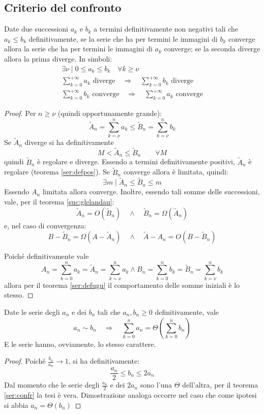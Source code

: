 \subsection{Criterio del confronto}
\begin{teor}
	\label{ser:confr}
	Date due successioni $a_k$ e $b_k$ a termini definitivamente non negativi tali che $a_k\leq b_k$ definitivamente, se la serie che ha per termini le immagini di $b_k$ converge allora la serie che ha per termini le immagini di $a_k$ converge; se la seconda diverge allora la prima diverge. In simboli:
	\begin{gather*}
		\exists\nu\mid 0\leq a_k\leq b_k \quad\forall k\geq\nu\\
		\sum_{k=0}^{+\infty} a_k \text{ diverge}\quad\Rightarrow\quad \sum_{k=0}^{+\infty} b_k \text{ diverge}\\
		\sum_{k=0}^{+\infty} b_k \text{ converge}\quad\Rightarrow\quad \sum_{k=0}^{+\infty} a_k \text{ converge}
	\end{gather*}
\end{teor}
\begin{proof}
	Per $n\geq\nu$ (quindi opportunamente grande):
	\[
		\tilde A_n=\sum_{k=\nu}^n a_k\leq \tilde B_n=\sum_{k=\nu}^n b_k
	\]
	Se $\tilde A_n$ diverge si ha definitivamente
	\[
		M<\tilde A_n\leq\tilde B_n\qquad\forall M
	\]
	quindi $\tilde B_n$ è regolare e diverge. Essendo a termini definitivamente positivi, $\tilde A_n$ è regolare (teorema \ref{ser:defpos}). Se $\tilde B_n$ converge allora è limitata, quindi:
	\[
		\exists m \mid \tilde A_n \leq \tilde B_n\leq m
	\]
	Essendo $A_n$ limitata allora converge. Inoltre, essendo tali somme delle successioni, vale, per il teorema \vref{suc:glelandau}:
	\begin{equation}
		\tilde A_n =O(\tilde B_n)\quad\land\quad\tilde B_n =\Omega(\tilde A_n)
	\end{equation}
	e, nel caso di convergenza:
	\begin{equation}
		B-\tilde B_n=\Omega(A-\tilde A_n)\quad\land\quad\tilde A-A_n=O(B-\tilde B_n)
	\end{equation}

	Poiché definitivamente vale
	\[
		A_n=\sum_{k=0}^n a_k=\tilde A_n=\sum_{k=\nu}^n a_k\land B_n=\sum_{k=0}^n b_k=\tilde B_n=\sum_{k=\nu}^n b_k
	\]
	allora per il teorema \ref{ser:defugu} il comportamento delle somme iniziali è lo stesso.
\end{proof}
\begin{corol}
	\label{ser:confrasin}
	Date le serie degli $a_n$ e dei $b_n$ tali che $a_n,b_n\geq0$ definitivamente, vale
	\[
		a_n\sim b_n\quad\Rightarrow\quad \sum_{k=0}^n a_n=\Theta\left(\sum_{k=0}^n b_n \right)
	\]
	E le serie hanno, ovviamente, lo stesso carattere.
\end{corol}
\begin{proof}
	Poiché $\frac{b_n}{a_n}\to1$, si ha definitivamente:
	\[
		\frac{a_n}{2}\leq b_n\leq 2a_n
	\]
	Dal momento che le serie degli $\frac{a_n}{2}$ e dei $2a_n$ sono l'una $\Theta$ dell'altra, per il teorema \ref{ser:confr} la tesi è vera. Dimostrazione analoga occorre nel caso che come ipotesi si abbia $a_n=\Theta(b_n)$
\end{proof}

